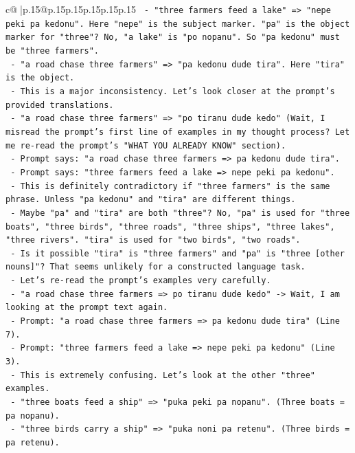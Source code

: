 \documentclass{article}
\begin{document}
{\begin{supertabular}{c@{$\;$}|p{.15\linewidth}@{}p{.15\linewidth}p{.15\linewidth}p{.15\linewidth}p{.15\linewidth}p{.15\linewidth}}
{{{\texttt{         {-} "three farmers feed a lake" => "nepe peki pa kedonu". Here "nepe" is the subject marker. "pa" is the object marker for "three"? No, "a lake" is "po nopanu". So "pa kedonu" must be "three farmers".} \\
\texttt{         {-} "a road chase three farmers" => "pa kedonu dude tira". Here "tira" is the object.} \\
\texttt{       {-} This is a major inconsistency. Let's look closer at the prompt's provided translations.} \\
\texttt{         {-} "a road chase three farmers" => "po tiranu dude kedo" (Wait, I misread the prompt's first line of examples in my thought process? Let me re{-}read the prompt's "WHAT YOU ALREADY KNOW" section).} \\
\texttt{         {-} Prompt says: "a road chase three farmers => pa kedonu dude tira".} \\
\texttt{         {-} Prompt says: "three farmers feed a lake => nepe peki pa kedonu".} \\
\texttt{         {-} This is definitely contradictory if "three farmers" is the same phrase. Unless "pa kedonu" and "tira" are different things.} \\
\texttt{         {-} Maybe "pa" and "tira" are both "three"? No, "pa" is used for "three boats", "three birds", "three roads", "three ships", "three lakes", "three rivers". "tira" is used for "two birds", "two roads".} \\
\texttt{         {-} Is it possible "tira" is "three farmers" and "pa" is "three {[}other nouns{]}"? That seems unlikely for a constructed language task.} \\
\texttt{         {-} Let's re{-}read the prompt's examples very carefully.} \\
\texttt{           {-} "a road chase three farmers => po tiranu dude kedo" {-}> Wait, I am looking at the prompt text again.} \\
\texttt{           {-} Prompt: "a road chase three farmers => pa kedonu dude tira" (Line 7).} \\
\texttt{           {-} Prompt: "three farmers feed a lake => nepe peki pa kedonu" (Line 3).} \\
\texttt{           {-} This is extremely confusing. Let's look at the other "three" examples.} \\
\texttt{             {-} "three boats feed a ship" => "puka peki pa nopanu". (Three boats = pa nopanu).} \\
\texttt{             {-} "three birds carry a ship" => "puka noni pa retenu". (Three birds = pa retenu).} \\
}}}
\end{supertabular}}
\end{document}
